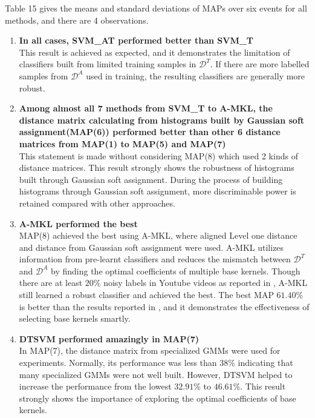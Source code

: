 \noindent Table 15 gives the means and standard deviations of MAPs over six events for all methods, and there are 4 observations.
\begin{enumerate}
  \item{\bf In all cases, SVM\_AT performed better than SVM\_T}\\
  This result is achieved as expected, and it demonstrates the limitation of classifiers built from limited training samples in $\mathcal{D}^T$. If there are more labelled samples from $\mathcal{D}^A$ used in training, the resulting classifiers are generally more robust. 

  \item{\bf Among almost all 7 methods from SVM\_T to A-MKL, the distance matrix calculating from histograms built by Gaussian soft assignment(MAP(6)) performed better than other 6 distance matrices from MAP(1) to MAP(5) and MAP(7)}\\
  This statement is made without considering MAP(8) which used 2 kinds of distance matrices. This result strongly shows the robustness of histograms built through Gaussian soft assignment. During the process of building histograms through Gaussian soft assignment, more discriminable power is retained compared with other approaches. 

  \item{\bf A-MKL performed the best}\\
  MAP(8) achieved the best using A-MKL, where aligned Level one distance and distance from Gaussian soft assignment were used. A-MKL utilizes information from pre-learnt classifiers and reduces the mismatch between $\mathcal{D}^T$ and $\mathcal{D}^A$ by finding the optimal coefficients of multiple base kernels. Though there are at least $20\%$ noisy labels in Youtube videos as reported in \cite{duan2012visual}, A-MKL still learned a robust classifier and achieved the best. The best MAP $61.40\%$ is better than the results reported in \cite{duan2012visual}, and it demonstrates the effectiveness of selecting base kernels smartly. 

  \item{\bf DTSVM performed amazingly in MAP(7)}\\
  In MAP(7), the distance matrix from specialized GMMs were used for experiments. Normally, its performance was less than $38\%$ indicating that many specialized GMMs were not well built. However, DTSVM helped to increase the performance from the lowest $32.91\%$ to $46.61\%$. This result strongly shows the importance of exploring the optimal coefficients of base kernels.

\end{enumerate}


